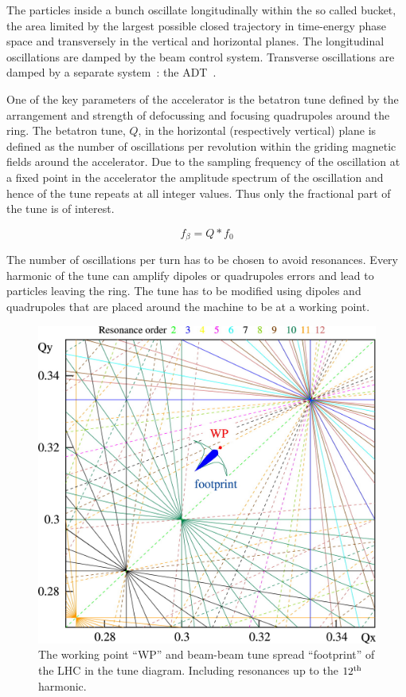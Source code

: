 The particles inside a bunch oscillate longitudinally within the so called bucket, the area limited by the largest possible closed trajectory in time-energy phase space and transversely in the vertical and horizontal planes. The longitudinal oscillations are damped by the beam control system. Transverse oscillations are damped by a separate system~: the \gls{ADT}~\cite{Zhabitsky:1141925,Benews11}.

One of the key parameters of the accelerator is the betatron tune defined by the arrangement and strength of defocussing and focusing quadrupoles around the ring. The betatron tune, $Q$, in the horizontal (respectively vertical) plane is defined as the number of oscillations per revolution within the griding magnetic fields around the accelerator. Due to the sampling frequency of the oscillation at a fixed point in the accelerator the amplitude spectrum of the oscillation and hence of the tune repeats at all integer values. Thus only the fractional part of the tune is of interest.

$$ f_{\beta} = Q * f_{0} $$

The number of oscillations per turn has to be chosen to avoid resonances. Every harmonic of the tune can amplify dipoles or quadrupoles errors and lead to particles leaving the ring. The tune has to be modified using dipoles and quadrupoles that are placed around the machine to be at a working point.

\begin{figure}[H]
\centering
\caption{The working point ``WP'' and beam-beam tune spread ``footprint'' of the LHC in the tune diagram. Including resonances up to the $12^{\rm {th}}$ harmonic.}
\includegraphics[scale=1.25]{lhc_working_point.jpeg}
\end{figure}

